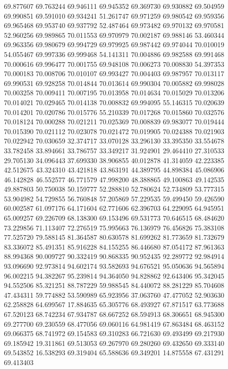 69.877607
69.763244
69.946111
69.945352
69.369730
69.930882
69.504959
69.990851
69.591010
69.934241
51.261747
69.971259
69.980542
69.959356
69.965468
69.953740
69.937792
52.487464
69.973482
69.970132
69.970581
52.960256
69.989865
70.011553
69.970979
70.002187
69.988146
53.460344
69.963356
69.980679
69.994729
69.979925
69.987442
69.974044
70.010019
54.055467
69.997336
69.999468
54.141311
70.004886
69.982588
69.991468
70.000616
69.996477
70.001755
69.948108
70.006273
70.008830
54.397353
70.000183
70.008706
70.010107
69.993427
70.004403
69.987957
70.013117
69.990531
69.928258
70.014844
70.013614
69.990304
70.005882
69.998028
70.003258
70.009411
70.007195
70.013958
70.014634
70.015029
70.013206
70.014021
70.029465
70.014138
70.008832
69.994095
55.146315
70.020639
70.014201
70.020786
70.015776
55.210339
70.017268
70.015860
70.032576
70.018124
70.000288
70.021211
70.025369
70.008839
69.983077
70.019444
70.015390
70.021112
70.023078
70.021472
70.019905
70.024388
70.021903
70.022942
70.030659
32.374717
33.070128
33.296130
33.395350
33.554678
33.782458
33.894661
33.786757
33.349217
31.924901
29.464410
27.310533
29.705130
34.096443
37.699330
38.906855
40.012878
41.314059
42.223385
42.512675
43.324310
43.421818
43.863191
44.389795
44.898384
45.086906
46.142828
46.552577
46.771579
47.998200
48.388865
49.100863
49.142535
49.887803
50.750038
50.159777
52.288810
52.780624
52.734809
53.777315
53.904982
54.729855
56.760848
57.205869
57.229535
59.499450
59.426590
60.002587
61.097176
64.171604
62.771606
62.396703
64.229095
64.945951
65.009257
69.226709
68.138300
69.153496
69.531773
70.646515
68.484620
73.229856
71.113407
72.276519
75.995663
76.136979
76.456826
75.383108
77.525720
79.588145
81.364587
80.630578
81.699262
81.773659
81.732679
83.336072
85.491351
85.916228
84.155255
86.446680
87.054172
87.961363
88.994368
90.009727
90.332419
90.868335
90.952435
92.289772
92.984914
93.096690
92.973814
94.602174
93.582693
94.676521
95.050636
94.565894
96.002215
94.382267
95.239814
94.364050
94.828862
92.643406
95.342045
94.552506
85.321251
88.787229
59.988545
84.440072
88.281229
85.704608
47.434311
59.774882
53.590989
65.923956
37.063760
47.477052
52.903630
62.258828
64.699567
17.884635
65.305776
68.493927
67.871517
63.773688
67.520123
68.742234
67.934787
68.667252
68.594913
68.306651
68.945300
69.277700
69.230559
68.477056
69.060116
64.981419
67.863484
68.463152
69.066375
68.741972
69.154583
69.310283
66.721630
69.493499
69.217930
69.185942
19.311861
69.513053
69.267970
69.280260
69.432650
69.333140
69.543852
16.538293
69.319404
65.588636
69.349201
14.875558
67.431291
69.413403

